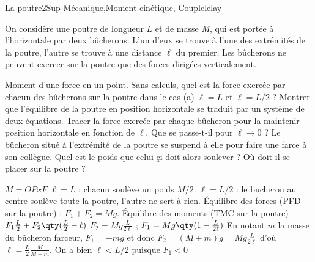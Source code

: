 \begin{exercise}{La poutre}{2}{Sup}
{Mécanique,Moment cinétique, Couple}{lelay}

On considère une poutre de longueur $L$ et de masse $M$, qui est portée à l'horizontale par deux bûcherons. L'un d'eux se trouve à l'une des extrémités de la poutre, l'autre se trouve à une distance $\ell$ du premier. Les bûcherons ne peuvent exercer sur la poutre que des forces dirigées verticalement.

\begin{questions}
    \questioncours Moment d'une force en un point.
    \question Sans calculs, quel est la force exercée par chacun des bûcherons sur la poutre dans le cas (a) $\ell = L$ et $\ell = L/2$ ?
    \question Montrer que l'équilibre de la poutre en position horizontale se traduit par un système de deux équations.
    \question Tracer la force exercée par chaque bûcheron pour la maintenir position horizontale en fonction de $\ell$. Que se passe-t-il pour $\ell \rightarrow 0$ ?
    \question Le bûcheron situé à l'extrémité de la poutre se suspend à elle pour faire une farce à son collègue. Quel est le poids que celui-çi doit alors soulever ? Où doit-il se placer sur la poutre ?
\end{questions}

\end{exercise}

\begin{solution}
    \begin{questions}
    \questioncours $M = OP x F$
    \question $\ell = L$ : chacun soulève un poids $M/2$. $\ell = L/2$ : le bucheron au centre soulève toute la poutre, l'autre ne sert à rien.
    \question Équilibre des forces (PFD sur la poutre) : $F_1 + F_2 = Mg$. Équilibre des moments (TMC sur la poutre) $F_1 \frac{L}{2} + F_2 \qty(\frac{L}{2}-\ell)$
    \question $F_2 = Mg\frac{L}{2\ell}$ ; $F_1 = Mg\qty(1 - \frac{L}{2\ell})$
    \question En notant $m$ la masse du bûcheron farceur, $F_1 = -mg$ et donc $F_2 = (M+m)g = Mg\frac{L}{2\ell}$ d'où $\ell = \frac{L}{2}\frac{M}{M+m}$. On a bien $\ell < L/2$ puisque $F_1 < 0$
    \end{questions}
\end{solution}